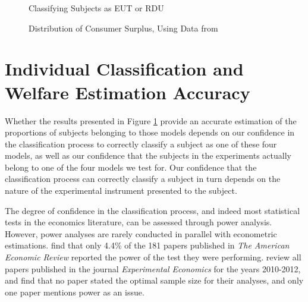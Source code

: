 \documentclass[../main.tex]{subfiles}
\begin{document}
\begin{figure}[h!]
	\center
	\caption{Classifying Subjects as EUT or RDU}
	\label{fig:HN_pvals}
\end{figure}

\begin{figure}[h!]
	\center
	\caption{Distribution of Consumer Surplus, Using Data from \textcite{Harrison2016}}
	\label{fig:HN_CS}
\end{figure}

\section{Individual Classification and Welfare Estimation Accuracy}
\label{sec4:IC}

Whether the results presented in Figure \ref{fig:HN_pvals} provide an accurate estimation of the proportions of subjects belonging to those models depends on our confidence in the classification process to correctly classify a subject as one of these four models, as well as our confidence that the subjects in the experiments actually belong to one of the four models we test for.
Our confidence that the classification process can correctly classify a subject in turn depends on the nature of the experimental instrument presented to the subject.

The degree of confidence in the classification process, and indeed most statistical tests in the economics literature, can be assessed through power analysis.{\footnotemark}
However, power analyses are rarely conducted in parallel with econometric estimations.
\textcite{McCloskey1996} find that only 4.4\% of the 181 papers published in \textit{The American Economic Review} reported the power of the test they were performing.
\textcite[6]{Zhang2013} review all papers published in the journal \textit{Experimental Economics} for the years 2010-2012, and find that no paper stated the optimal sample size for their analyses, and only one paper mentions power as an issue.

\addtocounter{footnote}{-1}
\end{document}
